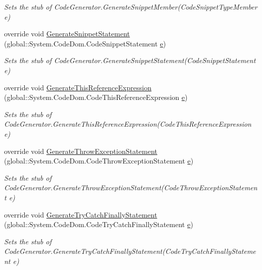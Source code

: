 \begin{DoxyCompactItemize}
\begin{DoxyCompactList}\small\item\em Sets the stub of Code\-Generator.\-Generate\-Snippet\-Member(\-Code\-Snippet\-Type\-Member e)\end{DoxyCompactList}\item 
override void \hyperlink{class_system_1_1_code_dom_1_1_compiler_1_1_fakes_1_1_stub_code_compiler_a5b56c18d8279e48426df04903dcee879}{Generate\-Snippet\-Statement} (global\-::\-System.\-Code\-Dom.\-Code\-Snippet\-Statement \hyperlink{jquery-1_810_82_8min_8js_a2c038346d47955cbe2cb91e338edd7e1}{e})
\begin{DoxyCompactList}\small\item\em Sets the stub of Code\-Generator.\-Generate\-Snippet\-Statement(\-Code\-Snippet\-Statement e)\end{DoxyCompactList}\item 
override void \hyperlink{class_system_1_1_code_dom_1_1_compiler_1_1_fakes_1_1_stub_code_compiler_aa93e7fc5021aae62e7a4e44b0c2c4c12}{Generate\-This\-Reference\-Expression} (global\-::\-System.\-Code\-Dom.\-Code\-This\-Reference\-Expression \hyperlink{jquery-1_810_82_8min_8js_a2c038346d47955cbe2cb91e338edd7e1}{e})
\begin{DoxyCompactList}\small\item\em Sets the stub of Code\-Generator.\-Generate\-This\-Reference\-Expression(\-Code\-This\-Reference\-Expression e)\end{DoxyCompactList}\item 
override void \hyperlink{class_system_1_1_code_dom_1_1_compiler_1_1_fakes_1_1_stub_code_compiler_a7c49e14ce974515a8dbe6c22538a1cb4}{Generate\-Throw\-Exception\-Statement} (global\-::\-System.\-Code\-Dom.\-Code\-Throw\-Exception\-Statement \hyperlink{jquery-1_810_82_8min_8js_a2c038346d47955cbe2cb91e338edd7e1}{e})
\begin{DoxyCompactList}\small\item\em Sets the stub of Code\-Generator.\-Generate\-Throw\-Exception\-Statement(\-Code\-Throw\-Exception\-Statement e)\end{DoxyCompactList}\item 
override void \hyperlink{class_system_1_1_code_dom_1_1_compiler_1_1_fakes_1_1_stub_code_compiler_ac2cfd3706898bb36239fae373e982ce6}{Generate\-Try\-Catch\-Finally\-Statement} (global\-::\-System.\-Code\-Dom.\-Code\-Try\-Catch\-Finally\-Statement \hyperlink{jquery-1_810_82_8min_8js_a2c038346d47955cbe2cb91e338edd7e1}{e})
\begin{DoxyCompactList}\small\item\em Sets the stub of Code\-Generator.\-Generate\-Try\-Catch\-Finally\-Statement(\-Code\-Try\-Catch\-Finally\-Statement e)\end{DoxyCompactList}\item 

\end{DoxyCompactItemize}
